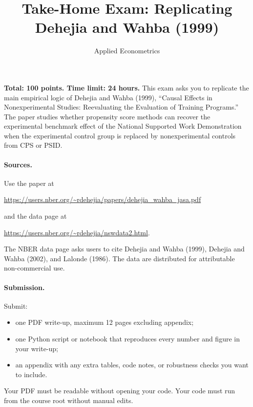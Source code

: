 \documentclass[11pt]{article}
\title{Take-Home Exam: Replicating Dehejia and Wahba (1999)}
\author{Applied Econometrics}
\date{}
\begin{document}
\maketitle

\noindent\textbf{Total: 100 points. Time limit: 24 hours.} This exam asks you to replicate the main empirical logic of Dehejia and Wahba (1999), ``Causal Effects in Nonexperimental Studies: Reevaluating the Evaluation of Training Programs.'' The paper studies whether propensity score methods can recover the experimental benchmark effect of the National Supported Work Demonstration when the experimental control group is replaced by nonexperimental controls from CPS or PSID.

\paragraph{Sources.} Use the paper at
\begin{center}
\url{https://users.nber.org/~rdehejia/papers/dehejia_wahba_jasa.pdf}
\end{center}
and the data page at
\begin{center}
\url{https://users.nber.org/~rdehejia/nswdata2.html}.
\end{center}
The NBER data page asks users to cite Dehejia and Wahba (1999), Dehejia and Wahba (2002), and Lalonde (1986). The data are distributed for attributable non-commercial use.

\paragraph{Submission.} Submit:
\begin{itemize}
  \item one PDF write-up, maximum 12 pages excluding appendix;
  \item one Python script or notebook that reproduces every number and figure in your write-up;
  \item an appendix with any extra tables, code notes, or robustness checks you want to include.
\end{itemize}
Your PDF must be readable without opening your code. Your code must run from the course root without manual edits.
\end{document}
